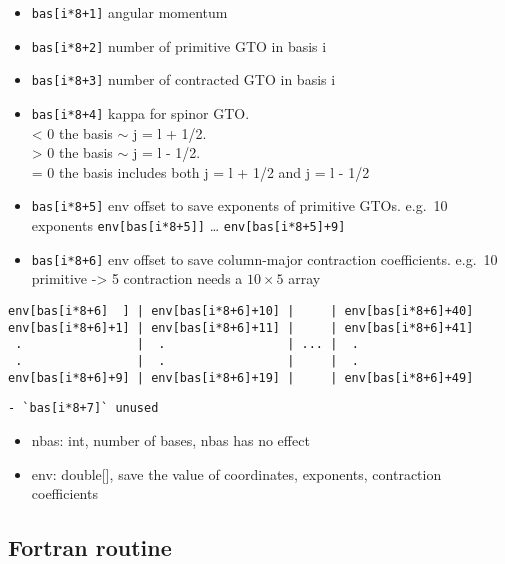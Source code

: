 \documentclass{article}
\begin{document}
\begin{itemize}
\begin{itemize}
  \item
    \verb!bas[i*8+1]! angular momentum
  \item
    \verb!bas[i*8+2]! number of primitive GTO in basis i
  \item
    \verb!bas[i*8+3]! number of contracted GTO in basis i
  \item
    \verb!bas[i*8+4]! kappa for spinor GTO.\\ \textless{} 0 the basis
    \ensuremath{\sim} j = l + 1/2.\\ \textgreater{} 0 the basis
    \ensuremath{\sim} j = l - 1/2.\\ = 0 the basis includes both j = l
    + 1/2 and j = l - 1/2
  \item
    \verb!bas[i*8+5]! env offset to save exponents of primitive GTOs.
    e.g.~10 exponents \verb!env[bas[i*8+5]]! \ldots{}
    \verb!env[bas[i*8+5]+9]!
  \item
    \verb!bas[i*8+6]! env offset to save column-major contraction
    coefficients. e.g.~10 primitive -\textgreater{} 5 contraction needs
    a $10\times 5$ array
  \end{itemize}
\end{itemize}
\begin{verbatim}
env[bas[i*8+6]  ] | env[bas[i*8+6]+10] |     | env[bas[i*8+6]+40]
env[bas[i*8+6]+1] | env[bas[i*8+6]+11] |     | env[bas[i*8+6]+41]
 .                |  .                 | ... |  .                
 .                |  .                 |     |  .                
env[bas[i*8+6]+9] | env[bas[i*8+6]+19] |     | env[bas[i*8+6]+49]
\end{verbatim}
\begin{verbatim}
- `bas[i*8+7]` unused
\end{verbatim}
\begin{itemize}
\item
  nbas: int, number of bases, nbas has no effect
\item
  env: double[], save the value of coordinates, exponents,
  contraction coefficients
\end{itemize}
\subsection{Fortran routine}
\end{document}
